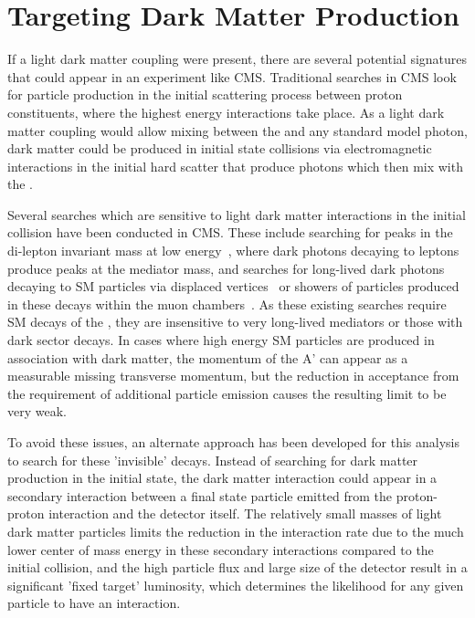 \section{Targeting Dark Matter Production}
If a light dark matter coupling were present, there are several potential signatures that could appear in an experiment like CMS.
Traditional searches in CMS look for particle production in the initial scattering process between proton constituents, where the highest energy interactions take place.
As a light dark matter coupling would allow mixing between the \aprime and any standard model photon, dark matter could be produced in initial state collisions via electromagnetic interactions in the initial hard scatter that produce photons which then mix with the \aprime.

Several searches which are sensitive to light dark matter interactions in the initial collision have been conducted in CMS.
These include searching for peaks in the di-lepton invariant mass at low energy~\cite{cmscollaboration2023search}, where dark photons decaying to leptons produce peaks at the mediator mass, and searches for long-lived dark photons decaying to SM particles via displaced vertices~\cite{cmsLLP_2022} or showers of particles produced in these decays within the muon chambers~\cite{Tumasyan_2021}.
As these existing searches require SM decays of the \aprime, they are insensitive to very long-lived mediators or those with dark sector decays.
In cases where high energy SM particles are produced in association with dark matter, the momentum of the A' can appear as a measurable missing transverse momentum, but the reduction in acceptance from the requirement of additional particle emission causes the resulting limit to be very weak.

To avoid these issues, an alternate approach has been developed for this analysis to search for these 'invisible' decays.
Instead of searching for dark matter production in the initial state, the dark matter interaction could appear in a secondary interaction between a final state particle emitted from the proton-proton interaction and the detector itself.
The relatively small masses of light dark matter particles limits the reduction in the interaction rate due to the much lower center of mass energy in these secondary interactions compared to the initial collision, and the high particle flux and large size of the detector result in a significant 'fixed target' luminosity, which determines the likelihood for any given particle to have an interaction.

